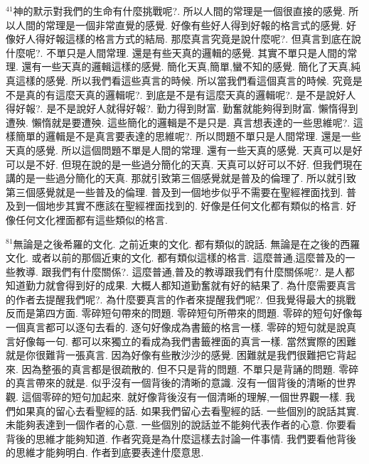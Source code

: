 \documentclass{book}
\begin{document}
$^{41}$神的默示對我們的生命有什麼挑戰呢?.
所以人間的常理是一個很直接的感覺.
所以人間的常理是一個非常直覺的感覺.
好像有些好人得到好報的格言式的感覺.
好像好人得好報這樣的格言方式的結局.
那麼真言究竟是說什麼呢?.
但真言到底在說什麼呢?.
不單只是人間常理.
還是有些天真的邏輯的感覺.
其實不單只是人間的常理.
還有一些天真的邏輯這樣的感覺.
簡化天真,簡單,蠻不知的感覺.
簡化了天真,純真這樣的感覺.
所以我們看這些真言的時候.
所以當我們看這個真言的時候.
究竟是不是真的有這麼天真的邏輯呢?.
到底是不是有這麼天真的邏輯呢?.
是不是說好人得好報?.
是不是說好人就得好報?.
勤力得到財富.
勤奮就能夠得到財富.
懶惰得到遭殃.
懶惰就是要遭殃.
這些簡化的邏輯是不是只是.
真言想表達的一些思維呢?.
這樣簡單的邏輯是不是真言要表達的思維呢?.
所以問題不單只是人間常理.
還是一些天真的感覺.
所以這個問題不單是人間的常理.
還有一些天真的感覺.
天真可以是好可以是不好.
但現在說的是一些過分簡化的天真.
天真可以好可以不好.
但我們現在講的是一些過分簡化的天真.
那就引致第三個感覺就是普及的倫理了.
所以就引致第三個感覺就是一些普及的倫理.
普及到一個地步似乎不需要在聖經裡面找到.
普及到一個地步其實不應該在聖經裡面找到的.
好像是任何文化都有類似的格言.
好像任何文化裡面都有這些類似的格言.

$^{81}$無論是之後希羅的文化.
之前近東的文化.
都有類似的說話.
無論是在之後的西羅文化.
或者以前的那個近東的文化.
都有類似這樣的格言.
這麼普通,這麼普及的一些教導.
跟我們有什麼關係?.
這麼普通,普及的教導跟我們有什麼關係呢?.
是人都知道勤力就會得到好的成果.
大概人都知道勤奮就有好的結果了.
為什麼需要真言的作者去提醒我們呢?.
為什麼要真言的作者來提醒我們呢?.
但我覺得最大的挑戰反而是第四方面.
零碎短句帶來的問題.
零碎短句所帶來的問題.
零碎的短句好像每一個真言都可以逐句去看的.
逐句好像成為書籤的格言一樣.
零碎的短句就是說真言好像每一句.
都可以來獨立的看成為我們書籤裡面的真言一樣.
當然實際的困難就是你很難背一張真言.
因為好像有些散沙沙的感覺.
困難就是我們很難把它背起來.
因為整張的真言都是很疏散的.
但不只是背的問題.
不單只是背誦的問題.
零碎的真言帶來的就是.
似乎沒有一個背後的清晰的意識.
沒有一個背後的清晰的世界觀.
這個零碎的短句加起來.
就好像背後沒有一個清晰的理解,一個世界觀一樣.
我們如果真的留心去看聖經的話.
如果我們留心去看聖經的話.
一些個別的說話其實.
未能夠表達到一個作者的心意.
一些個別的說話並不能夠代表作者的心意.
你要看背後的思維才能夠知道.
作者究竟是為什麼這樣去討論一件事情.
我們要看他背後的思維才能夠明白.
作者到底要表達什麼意思.
\end{document}
